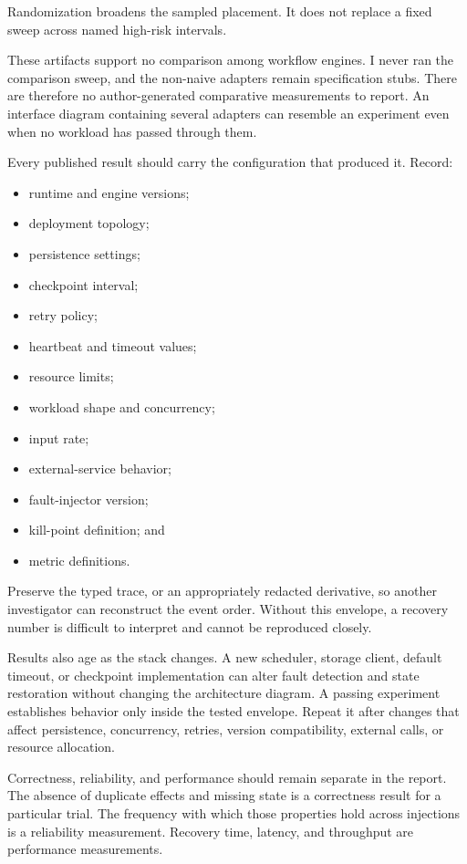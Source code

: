 Randomization broadens the sampled placement. It does not replace a fixed sweep across named high-risk intervals.

These artifacts support no comparison among workflow engines. I never ran the comparison sweep, and the non-naive adapters remain specification stubs. There are therefore no author-generated comparative measurements to report. An interface diagram containing several adapters can resemble an experiment even when no workload has passed through them.

Every published result should carry the configuration that produced it. Record:

\begin{itemize}
\tightlist
\item
  runtime and engine versions;
\item
  deployment topology;
\item
  persistence settings;
\item
  checkpoint interval;
\item
  retry policy;
\item
  heartbeat and timeout values;
\item
  resource limits;
\item
  workload shape and concurrency;
\item
  input rate;
\item
  external-service behavior;
\item
  fault-injector version;
\item
  kill-point definition; and
\item
  metric definitions.
\end{itemize}

Preserve the typed trace, or an appropriately redacted derivative, so another investigator can reconstruct the event order. Without this envelope, a recovery number is difficult to interpret and cannot be reproduced closely.

Results also age as the stack changes. A new scheduler, storage client, default timeout, or checkpoint implementation can alter fault detection and state restoration without changing the architecture diagram. A passing experiment establishes behavior only inside the tested envelope. Repeat it after changes that affect persistence, concurrency, retries, version compatibility, external calls, or resource allocation.

Correctness, reliability, and performance should remain separate in the report. The absence of duplicate effects and missing state is a correctness result for a particular trial. The frequency with which those properties hold across injections is a reliability measurement. Recovery time, latency, and throughput are performance measurements.

